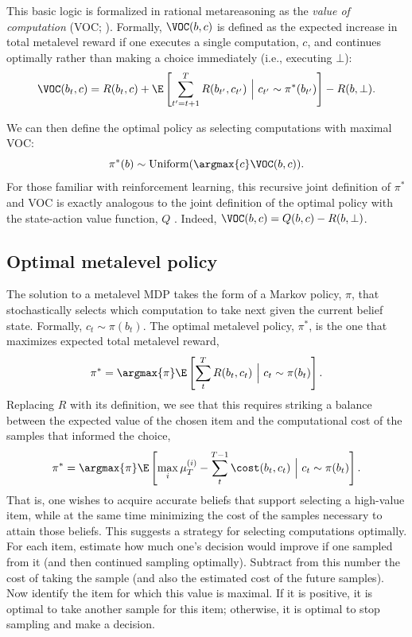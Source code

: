 This basic logic is formalized in rational metareasoning as the \textit{value of computation} (VOC; \citealp{russell1991principles}). Formally, $\VOC(b, c)$ is defined as the expected increase in total metalevel reward if one executes a single computation, $c$, and continues optimally rather than making a choice immediately (i.e., executing $\bot$):
$$
\VOC(b_t, c) = R(b_t, c) + \E \left[
  \sum_{t'=t+1}^T R(b_{t'}, c_{t'})\ \Big\vert\ c_{t'} \sim \pi^*(b_{t'}) 
\right] - R(b, \bot).
$$

We can then define the optimal policy as selecting computations with maximal VOC:
$$
\pi^*(b) \sim \text{Uniform}(\argmax{c} \VOC(b, c)).
$$
For those familiar with reinforcement learning, this recursive joint definition of $\pi^*$ and VOC is exactly analogous to the joint definition of the optimal policy with the state-action value function, $Q$ \citep{sutton2018reinforcement}. Indeed, $\VOC(b, c) = Q(b, c) - R(b, \bot)$. 

\subsection{Optimal metalevel policy}


The solution to a metalevel MDP takes the form of a Markov policy, $\pi$, that stochastically selects which computation to take next given the current belief state. Formally, $c_t \sim \pi(b_t)$. The optimal metalevel policy, $\pi^*$, is the one that maximizes expected total metalevel reward,
\begin{equation*}
  \pi^* = \argmax{\pi} \E \left[ \sum_t^T R(b_t, c_t) \ \Big\vert\ c_t \sim \pi(b_t) \right].
\end{equation*}
Replacing $R$ with its definition, we see that this requires striking a balance between the expected value of the chosen item and the computational cost of the samples that informed the choice,
\begin{equation*}
  \pi^* = \argmax{\pi} \E \left[
     \max_i \mu_T^{(i)} - \sum_t^{T-1} \cost(b_t, c_t)
   \ \Big\vert\ c_t \sim \pi(b_t) \right].
\end{equation*}
That is, one wishes to acquire accurate beliefs that support selecting a high-value item, while at the same time minimizing the cost of the samples necessary to attain those beliefs. This suggests a strategy for selecting computations optimally. For each item, estimate how much one's decision would improve if one sampled from it (and then continued sampling optimally). Subtract from this number the cost of taking the sample (and also the estimated cost of the future samples). Now identify the item for which this value is maximal. If it is positive, it is optimal to take another sample for this item; otherwise, it is optimal to stop sampling and make a decision.

